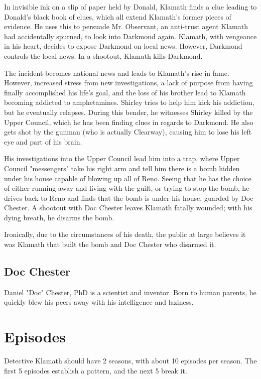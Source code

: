 \documentclass{article}
\begin{document}
In invisible ink on a slip of paper held by Donald, Klamath finds a clue leading to Donald's black book of clues, which all extend Klamath's former pieces of evidence. He uses this to persuade Mr. Observant, an anti-trust agent Klamath had accidentally spurned, to look into Darkmond again. Klamath, with vengeance in his heart, decides to expose Darkmond on local news. However, Darkmond controls the local news. In a shootout, Klamath kills Darkmond.

The incident becomes national news and leads to Klamath's rise in fame. However, increased stress from new investigations, a lack of purpose from having finally accomplished his life's goal, and the loss of his brother lead to Klamath becoming addicted to amphetamines. Shirley tries to help him kick his addiction, but he eventually relapses. During this bender, he witnesses Shirley killed by the Upper Council, which he has been finding clues in regards to Darkmond. He also gets shot by the gunman (who is actually Clearway), causing him to lose his left eye and part of his brain.

His investigations into the Upper Council lead him into a trap, where Upper Council "messengers" take his right arm and tell him there is a bomb hidden under his house capable of blowing up all of Reno. Seeing that he has the choice of either running away and living with the guilt, or trying to stop the bomb, he drives back to Reno and finds that the bomb is under his house, guarded by Doc Chester. A shootout with Doc Chester leaves Klamath fatally wounded; with his dying breath, he disarms the bomb.

Ironically, due to the circumstances of his death, the public at large believes it was Klamath that built the bomb and Doc Chester who disarmed it.

\subsection{Doc Chester}

Daniel "Doc" Chester, PhD is a scientist and inventor. Born to human parents, he quickly blew his peers away with his intelligence and laziness. 

\section{Episodes}

Detective Klamath should have 2 seasons, with about 10 episodes per season. The first 5 episodes establish a pattern, and the next 5 break it.
\end{document}
